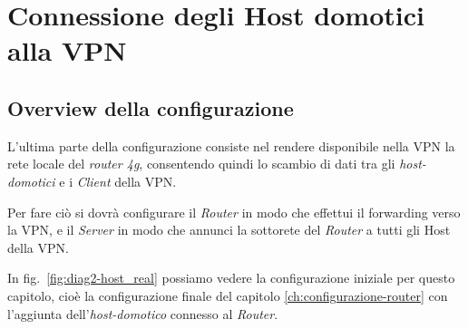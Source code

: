
\chapter{Connessione degli Host domotici alla VPN}
\label{ch:connessione-host-domotici}

\section{Overview della configurazione \ok}

L'ultima parte della configurazione consiste nel rendere disponibile nella VPN la rete locale del \textit{router 4g}, consentendo quindi lo scambio di dati tra gli \textit{host-domotici} e i \textit{Client} della VPN.

Per fare ciò si dovrà configurare il \textit{Router} in modo che effettui il forwarding verso la VPN, e il \textit{Server} in modo che annunci la sottorete del \textit{Router} a tutti gli Host della VPN.


In fig.~\ref{fig:diag2-host_real} possiamo vedere la configurazione iniziale per questo capitolo, cioè la configurazione finale del capitolo \ref{ch:configurazione-router} con l'aggiunta dell'\textit{host-domotico} connesso al \textit{Router}. 


